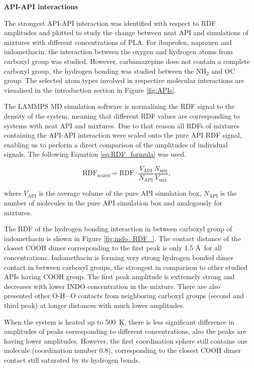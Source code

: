 \textbf{API-API interactions}

\vspace{-0.2cm}
The strongest API-API interaction was identified with respect to RDF amplitudes and plotted to study the change between neat API and simulations of mixtures with different concentrations of PLA. For ibuprofen, naproxen and indomethacin, the interaction between the oxygen and hydrogen atoms from carboxyl group was studied. However, carbamazepine does not contain a complete carboxyl group, the hydrogen bonding was studied between the N$\text{H}_\text{2}$ and OC group. The selected atom types involved in respective molecular interactions are visualised in the introduction section in Figure \ref{fig:APIs}. 

The LAMMPS MD simulation software is normalizing the RDF signal to the density of the system, meaning that different RDF values are corresponding to systems with neat API and mixtures. Due to that reason all RDFs of mixtures containing the API-API interaction were scaled onto the pure API RDF signal, enabling us to perform a direct comparison of the amplitudes of individual signals. The following Equation \ref{eq:RDF_formula} was used.

\begin{equation}\label{eq:RDF_formula}
	\text{RDF}_{\text{scaled}} = \text{RDF} \cdot \frac{V_{\text{API}}}{N_{\text{API}}} \frac{N_{\text{mix}}}{V_{\text{mix}}},
\end{equation}

\vspace{-0.2cm}

where $V_{\text{API}}$ is the average volume of the pure API simulation box, $N_{\text{API}}$ is the number of molecules in the pure API simulation box and analogously for mixtures.

The RDF of the hydrogen bonding interaction in between carboxyl group of indomethacin is shown in Figure \ref{fig:indo_RDF_}. The contact distance of the closest COOH dimer corresponding to the first peak is only 1.5 \AA~for all concentrations. Indomethacin is forming very strong hydrogen bonded dimer contact in between carboxyl groups, the strongest in comparison to other studied APIs having COOH group. The first peak amplitude is extremely strong and decreases with lower INDO concentration in the mixture. There are also presented other O-H$\cdots$O contacts from neighboring carboxyl groups (second and third peak) at longer distances with much lower amplitudes.

When the system is heated up to 500~K, there is less significant difference in amplitudes of peaks corresponding to different concentrations, also the peaks are having lower amplitudes. However, the first coordination sphere still contains one molecule (coordination number 0.8), corresponding to the closest COOH dimer contact still saturated by its hydrogen bonds.

